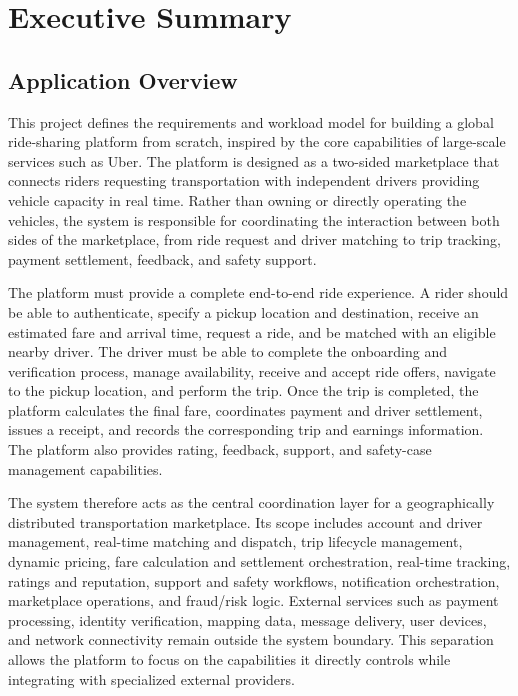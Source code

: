 \section{Executive Summary}


\subsection{Application Overview}

This project defines the requirements and workload model for building a global ride-sharing platform from scratch, inspired by the core capabilities of large-scale services such as Uber. The platform is designed as a two-sided marketplace that connects riders requesting transportation with independent drivers providing vehicle capacity in real time. Rather than owning or directly operating the vehicles, the system is responsible for coordinating the interaction between both sides of the marketplace, from ride request and driver matching to trip tracking, payment settlement, feedback, and safety support.

The platform must provide a complete end-to-end ride experience. A rider should be able to authenticate, specify a pickup location and destination, receive an estimated fare and arrival time, request a ride, and be matched with an eligible nearby driver. The driver must be able to complete the onboarding and verification process, manage availability, receive and accept ride offers, navigate to the pickup location, and perform the trip. Once the trip is completed, the platform calculates the final fare, coordinates payment and driver settlement, issues a receipt, and records the corresponding trip and earnings information. The platform also provides rating, feedback, support, and safety-case management capabilities.

The system therefore acts as the central coordination layer for a geographically distributed transportation marketplace. Its scope includes account and driver management, real-time matching and dispatch, trip lifecycle management, dynamic pricing, fare calculation and settlement orchestration, real-time tracking, ratings and reputation, support and safety workflows, notification orchestration, marketplace operations, and fraud/risk logic. External services such as payment processing, identity verification, mapping data, message delivery, user devices, and network connectivity remain outside the system boundary. This separation allows the platform to focus on the capabilities it directly controls while integrating with specialized external providers.

